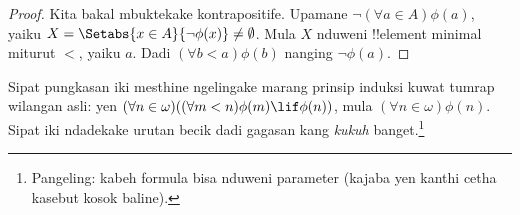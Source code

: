 \documentclass[../../../include/open-logic-section]{subfiles}
\begin{document}
\begin{proof}
Kita bakal mbuktekake kontrapositife. Upamane
$\lnot(\forall a \in A)\phi(a)$, yaiku
$X = \Setabs{x \in A}{\lnot\phi(x)} \neq \emptyset$.
Mula $X$ nduweni !!{element} minimal miturut $<$,
yaiku $a$. Dadi $(\forall b < a)\phi(b)$ nanging
$\lnot \phi(a)$. \end{proof}\noindent Sipat pungkasan
iki mesthine ngelingake marang prinsip
induksi kuwat tumrap wilangan asli: yen
$(\forall n \in \omega)((\forall m < n)\phi(m) \lif
\phi(n))$, mula $(\forall n \in \omega)\phi(n)$.
Sipat iki ndadekake urutan becik dadi gagasan kang
\emph{kukuh} banget.\footnote{Pangeling: kabeh formula bisa
nduweni parameter (kajaba yen kanthi cetha kasebut
kosok baline).}
\end{document}
